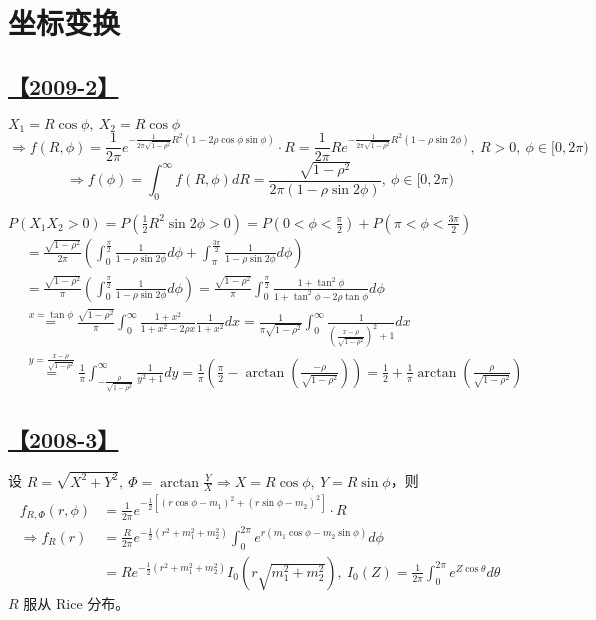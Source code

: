 \section{坐标变换}

\subsection{\hyperref[Q2009-2]{【2009-2】}}\label{A2009-2}

$X_1=R\cos\phi,\ X_2=R\cos\phi$
$$\Rightarrow
f(R, \phi)=\frac{1}{2\pi}e^{-\frac{1}{2\pi\sqrt{1-\rho^2}}R^2(1-2\rho\cos\phi\sin\phi)}\cdot R=\frac{1}{2\pi}Re^{-\frac{1}{2\pi\sqrt{1-\rho^2}}R^2(1-\rho\sin2\phi)}, \ R>0,\ \phi\in[0, 2\pi)
$$
$$
\Rightarrow f(\phi)=\int_0^\infty f(R, \phi)dR=\frac{\sqrt{1-\rho^2}}{2\pi(1-\rho\sin 2\phi)},\ \phi\in[0, 2\pi)
$$

$P(X_1X_2>0)=P(\frac{1}{2}R^2\sin2\phi>0)=P(0<\phi<\frac{\pi}{2})+P(\pi<\phi<\frac{3\pi}{2})$
\begin{equation}\tag*{}
\begin{split}
&=\frac{\sqrt{1-\rho^2}}{2\pi}\left(\int_0^\frac{\pi}{2}\frac{1}{1-\rho\sin 2\phi}d\phi+\int_\pi^\frac{3\pi}{2}\frac{1}{1-\rho\sin 2\phi}d\phi\right)\\
&=\frac{\sqrt{1-\rho^2}}{\pi}\left(\int_0^\frac{\pi}{2}\frac{1}{1-\rho\sin 2\phi}d\phi\right)=\frac{\sqrt{1-\rho^2}}{\pi}\int_0^\frac{\pi}{2}\frac{1+\tan^2\phi}{1+\tan^2\phi-2\rho\tan\phi}d\phi\\
&\overset{x=\tan\phi}{=}\frac{\sqrt{1-\rho^2}}{\pi}\int_0^\infty\frac{1+x^2}{1+x^2-2\rho x}\frac{1}{1+x^2}dx=\frac{1}{\pi\sqrt{1-\rho^2}}\int_0^\infty\frac{1}{(\frac{x-\rho}{\sqrt{1-\rho^2}})^2+1}dx\\
&\overset{y=\frac{x-\rho}{\sqrt{1-\rho^2}}}{=}\frac{1}{\pi}\int_{-\frac{\rho}{\sqrt{1-\rho^2}}}^{\infty}\frac{1}{y^2+1}dy=\frac{1}{\pi}\left(\frac{\pi}{2}-\arctan\left(\frac{-\rho}{\sqrt{1-\rho^2}}\right)\right)=\frac{1}{2}+\frac{1}{\pi}\arctan\left(\frac{\rho}{\sqrt{1-\rho^2}}\right)
\end{split}
\end{equation}

\subsection{\hyperref[Q2008-3]{【2008-3】}}\label{A2008-3}

设 $R=\sqrt{X^2+Y^2},\ \Phi=\arctan\frac{Y}{X}\Rightarrow X=R\cos\phi,\ Y=R\sin\phi$，则
\begin{equation}\tag*{}
\begin{split}
f_{R, \Phi}(r, \phi)&=\frac{1}{2\pi}e^{-\frac{1}{2}[(r\cos\phi-m_1)^2+(r\sin\phi-m_2)^2]}\cdot R\\
\Rightarrow f_R(r)&=\frac{R}{2\pi}e^{-\frac{1}{2}(r^2+m_1^2+m_2^2)}\int_0^{2\pi}e^{r(m_1\cos\phi-m_2\sin\phi)}d\phi\\
&=Re^{-\frac{1}{2}(r^2+m_1^2+m_2^2)}I_0\left(r\sqrt{m_1^2+m_2^2}\right),\ I_0(Z)=\frac{1}{2\pi}\int_0^{2\pi}e^{Z\cos\theta}d\theta
\end{split}
\end{equation}
$R$ 服从 Rice 分布。

